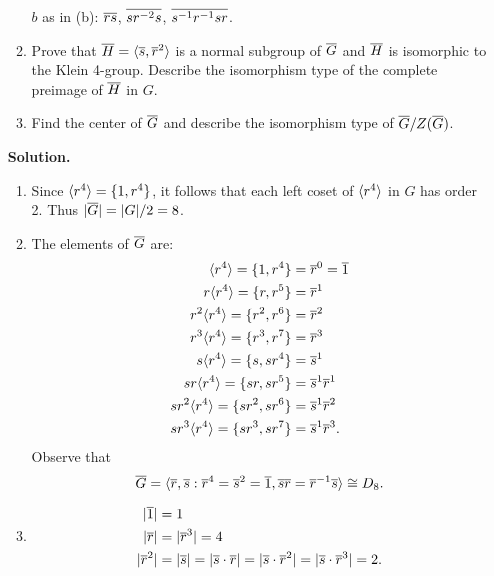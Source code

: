 \begin{enumerate}
\begin{enumerate}
                           $b$ as in (b): \quad $\overline{rs}$, \quad $\overline{sr^{-2}s}$,
                           \quad $\overline{s^{-1}r^{-1}sr}$.
                     \item Prove that $\overline{H} = \langle \overline{s}, \overline{r}^2 \rangle$ is a normal
                           subgroup of $\overline{G}$ and $\overline{H}$ is isomorphic to the
                           Klein 4-group. Describe the isomorphism type of the
                           complete preimage of $\overline{H}$ in $G$.
                     \item Find the center of $\overline{G}$ and describe the
                           isomorphism type of $\overline{G}/Z(\overline{G})$.
                  \end{enumerate}

      \textbf{Solution.}

      \begin{enumerate}
         \item Since $\langle r^4 \rangle = \{1, r^4\}$, it follows that each left coset
               of $\langle r^4 \rangle$ in $G$ has order 2. Thus $|\overline{G}| = |G|/2 = 8$.
         \item The elements of $\overline{G}$ are:
               \begin{align*}
                  \langle r^4 \rangle = \{1, r^4\} &= \overline{r}^0 = \overline{1} \\
                  r\langle r^4 \rangle = \{r, r^5\} &= \overline{r}^1 \\
                  r^2\langle r^4 \rangle = \{r^2, r^6\} &= \overline{r}^2 \\
                  r^3\langle r^4 \rangle = \{r^3, r^7\} &= \overline{r}^3 \\
                  s\langle r^4 \rangle = \{s, sr^4\} &= \overline{s}^1 \\
                  sr\langle r^4 \rangle = \{sr, sr^5\} &= \overline{s}^1\overline{r}^1 \\
                  sr^2\langle r^4 \rangle = \{sr^2, sr^6\} &= \overline{s}^1\overline{r}^2 \\
                  sr^3\langle r^4 \rangle = \{sr^3, sr^7\} &= \overline{s}^1\overline{r}^3.
               \end{align*}
               Observe that
               $$\overline{G} = \langle \overline{r}, \overline{s} : \overline{r}^4 = \overline{s}^2 = \overline{1},
                 \overline{s}\overline{r}  = \overline{r}^{-1}\overline{s} \rangle \cong D_8.$$
         \item \begin{align*}
                  |\m{1}| &= 1 \\
                  |\m{r}| &= |\m{r}^3| = 4 \\
                  |\m{r}^2|&= |\m{s}| = |\m{s}\cdot\m{r}| =
                  |\m{s}\cdot\m{r}^2| = |\m{s}\cdot\m{r}^3| = 2.

\end{align*}
\end{enumerate}
\end{enumerate}

